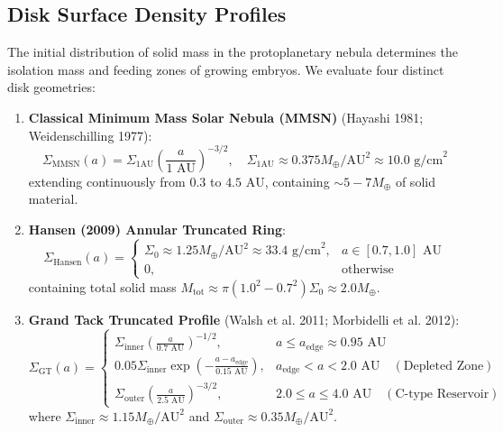 \documentclass[11pt,a4paper]{article}
\begin{document}
\subsection{Disk Surface Density Profiles}
The initial distribution of solid mass in the protoplanetary nebula determines the isolation mass and feeding zones of growing embryos. We evaluate four distinct disk geometries:
\begin{enumerate}
    \item \textbf{Classical Minimum Mass Solar Nebula (MMSN)} (Hayashi 1981; Weidenschilling 1977):
    \begin{equation}
    \Sigma_{\text{MMSN}}(a) = \Sigma_{1\text{AU}} \left(\frac{a}{1\text{ AU}}\right)^{-3/2}, \quad \Sigma_{1\text{AU}} \approx 0.375 M_\oplus/\text{AU}^2 \approx 10.0\text{ g/cm}^2
    \end{equation}
    extending continuously from $0.3$ to $4.5\text{ AU}$, containing $\sim 5-7 M_\oplus$ of solid material.
    
    \item \textbf{Hansen (2009) Annular Truncated Ring}:
    \begin{equation}
    \Sigma_{\text{Hansen}}(a) = \begin{cases} \Sigma_0 \approx 1.25 M_\oplus/\text{AU}^2 \approx 33.4\text{ g/cm}^2, & a \in [0.7, 1.0]\text{ AU} \\ 0, & \text{otherwise} \end{cases}
    \end{equation}
    containing total solid mass $M_{\text{tot}} \approx \pi (1.0^2 - 0.7^2) \Sigma_0 \approx 2.0 M_\oplus$.
    
    \item \textbf{Grand Tack Truncated Profile} (Walsh et al. 2011; Morbidelli et al. 2012):
    \begin{equation}
    \Sigma_{\text{GT}}(a) = \begin{cases}
    \Sigma_{\text{inner}} \left(\frac{a}{0.7\text{ AU}}\right)^{-1/2}, & a \le a_{\text{edge}} \approx 0.95\text{ AU} \\
    0.05 \Sigma_{\text{inner}} \exp\left(-\frac{a - a_{\text{edge}}}{0.15\text{ AU}}\right), & a_{\text{edge}} < a < 2.0\text{ AU} \quad (\text{Depleted Zone}) \\
    \Sigma_{\text{outer}} \left(\frac{a}{2.5\text{ AU}}\right)^{-3/2}, & 2.0 \le a \le 4.0\text{ AU} \quad (\text{C-type Reservoir})
    \end{cases}
    \end{equation}
    where $\Sigma_{\text{inner}} \approx 1.15 M_\oplus/\text{AU}^2$ and $\Sigma_{\text{outer}} \approx 0.35 M_\oplus/\text{AU}^2$.
\end{enumerate}
\end{document}
